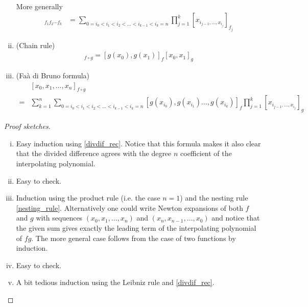 \begin{prop}
\begin{enumerate}[(i)]
\begin{align}
		\end{align}
		More generally
		\begin{align*}
			[x_{0}, x_{1}, \ldots, x_{n}]_{f_{1} f_{2} \cdots f_{k}} &= \sum_{0 = i_{0} < i_{1} < i_{2} < \ldots < i_{k - 1} < i_{k} = n} \prod_{j = 1}^{k} [x_{i_{j - 1}, \ldots, x_{i_{j}}}]_{f_{j}}
		\end{align*}
		\item (Chain rule)
		\begin{align*}
			[x_{0}, x_{1}]_{f \circ g} = [g(x_{0}), g(x_{1})]_{f} [x_{0}, x_{1}]_{g}
		\end{align*}
		\item (Fa\`{a} di Bruno formula)
		\begin{align*}
			& [x_{0}, x_{1}, \ldots, x_{n}]_{f \circ g} \\
			=& \sum_{k = 1}^{n} \sum_{0 = i_{0}< i_{1} < i_{2} < \ldots < i_{k - 1} < i_{k} =  n} [g(x_{i_{0}}), g(x_{i_{1}})\ldots , g(x_{i_{k}})]_{f} \prod_{j = 1}^{k} [x_{i_{j - 1}, \ldots, x_{i_{j}}}]_{g}
		\end{align*}
	\end{enumerate}
\end{prop}
\begin{proof}[Proof sketches]
	\begin{enumerate}[(i)]
		\item Easy induction using \ref{divdif_rec}. Notice that this formula makes it also clear that the divided difference agrees with the degree $n$ coefficient of the interpolating polynomial.
		\item Easy to check.
		\item Induction using the product rule (i.e. the case $n = 1$) and the nesting rule \ref{nesting_rule}. Alternatively one could write Newton expansions of both $f$ and $g$ with sequences $(x_{0}, x_{1}, \ldots, x_{n})$ and $(x_{n}, x_{n - 1}, \ldots, x_{0})$ and notice that the given sum gives exactly the leading term of the interpolating polynomial of $f g$. The more general case follows from the case of two functions by induction.
		\item Easy to check.
		\item A bit tedious induction using the Leibniz rule and \ref{divdif_rec}.
	\end{enumerate}
\end{proof}

